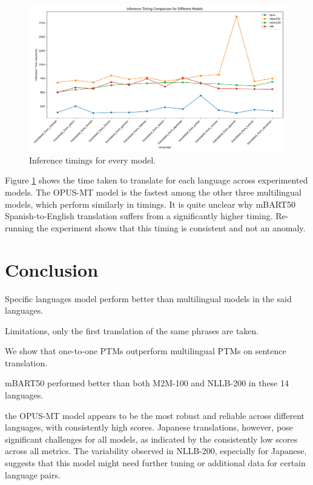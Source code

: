 \documentclass[a4paper]{article}
\begin{document}
\begin{figure}[htbp]
    \centering
    \includegraphics[width=0.9\linewidth]{figures/inference_timings.png}
    \caption{Inference timings for every model.}
    \label{fig:inference_timings}
\end{figure}

Figure \ref{fig:inference_timings} shows the time taken to translate for each language across experimented models. The OPUS-MT model is the fastest among the other three multilingual models, which perform similarly in timings. It is quite unclear why mBART50 Spanish-to-English translation suffers from a significantly higher timing. Re-running the experiment shows that this timing is consistent and not an anomaly.

\section{Conclusion}

Specific languages model perform better than multilingual models in the said languages.

Limitations, only the first translation of the same phrases are taken.

We show that one-to-one PTMs outperform multilingual PTMs on sentence translation.

mBART50 performed better than both M2M-100 and NLLB-200 in these 14 languages.


the OPUS-MT model appears to be the most robust and reliable across different languages, with consistently high scores. Japanese translations, however, pose significant challenges for all models, as indicated by the consistently low scores across all metrics. The variability observed in NLLB-200, especially for Japanese, suggests that this model might need further tuning or additional data for certain language pairs.


\printbibliography
\end{document}
